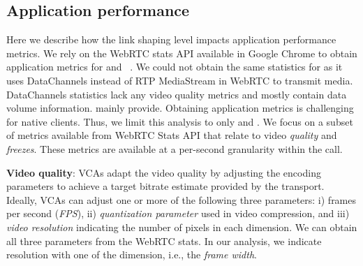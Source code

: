 \subsection{Application performance}
Here we describe how the link shaping level impacts application performance metrics. %
We rely on the WebRTC stats API available in Google Chrome to obtain application metrics for \teamsbrowser and \meet~\cite{webrtc_stats}. We could not obtain the same statistics for \zoombrowser as it uses DataChannels instead of RTP MediaStream in WebRTC to transmit media. DataChannels statistics lack any video quality metrics and mostly contain data volume information. mainly provide. Obtaining application metrics is challenging for native clients.  %
Thus, we limit this analysis to only \meet and \teamsbrowser. We focus on a subset of metrics available from WebRTC Stats API that relate to video \textit{quality} and \textit{freezes}. These metrics are available at a per-second granularity within the call. %


\textbf{Video quality}: VCAs adapt the video quality by adjusting the encoding parameters to achieve a target bitrate estimate provided by the transport. Ideally, VCAs can adjust one or more of the following three parameters: i) frames per second (\textit{FPS}), ii) \textit{quantization parameter} used in video compression, and  iii) \textit{video resolution} indicating the number of pixels in each dimension. We can obtain all three parameters from the WebRTC stats. In our analysis, we indicate resolution with one of the dimension, i.e., the \textit{frame width}. 

